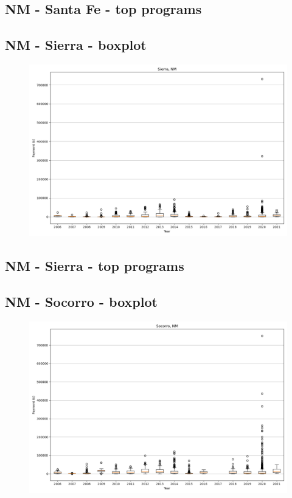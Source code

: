 \subsection*{NM - Santa Fe - top programs}

\newpage
\subsection*{NM - Sierra - boxplot}
\begin{figure}[h]
\centering
\includegraphics[width=7in]{../output/boxplots/counties/Sierra-NM_boxplot.png}
\end{figure}


\subsection*{NM - Sierra - top programs}

\newpage
\subsection*{NM - Socorro - boxplot}
\begin{figure}[h]
\centering
\includegraphics[width=7in]{../output/boxplots/counties/Socorro-NM_boxplot.png}
\end{figure}


